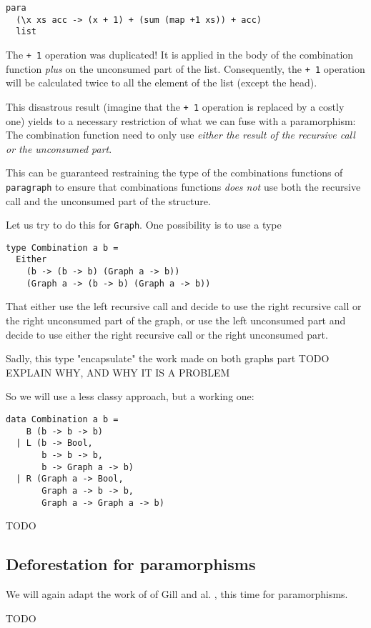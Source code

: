 \documentclass[format=sigplan]{acmart}
\newcommand{\minline}[1]{\texttt{#1}}
\begin{document}
\begin{verbatim}
para
  (\x xs acc -> (x + 1) + (sum (map +1 xs)) + acc)
  list
\end{verbatim}

The \minline{+ 1} operation was duplicated! It is applied in the body of the combination function \emph{plus} on the unconsumed part of the list. Consequently, the \minline{+ 1} operation will be calculated twice to all the element of the list (except the head).

This disastrous result (imagine that the \minline{+ 1} operation is replaced by a costly one) yields to a necessary restriction of what we can fuse with a paramorphism:
The combination function need to only use \emph{either the result of the recursive call or the unconsumed part}.

This can be guaranteed restraining the type of the combinations functions of \minline{paragraph} to ensure that combinations functions \emph{does not} use both the recursive call and the unconsumed part of the structure.

Let us try to do this for \minline{Graph}.
One possibility is to use a type
\begin{verbatim}
type Combination a b =
  Either
    (b -> (b -> b) (Graph a -> b))
    (Graph a -> (b -> b) (Graph a -> b))
\end{verbatim}

That either use the left recursive call and decide to use the right recursive call or the right unconsumed part of the graph, or use the left unconsumed part and decide to use either the right recursive call or the right unconsumed part.

Sadly, this type "encapsulate" the work made on both graphs part TODO EXPLAIN WHY, AND WHY IT IS A PROBLEM

So we will use a less classy approach, but a working one:
\begin{verbatim}
data Combination a b =
    B (b -> b -> b)
  | L (b -> Bool, 
       b -> b -> b, 
       b -> Graph a -> b)
  | R (Graph a -> Bool, 
       Graph a -> b -> b,
       Graph a -> Graph a -> b)
\end{verbatim}
TODO
\subsection{Deforestation for paramorphisms}
\label{sec:defor-para}
We will again adapt the work of of Gill and al. \cite{Gill:1993:SCD:165180.165214}, this time for paramorphisms.

\begin{acks}
TODO
\end{acks}
	



\end{document}
